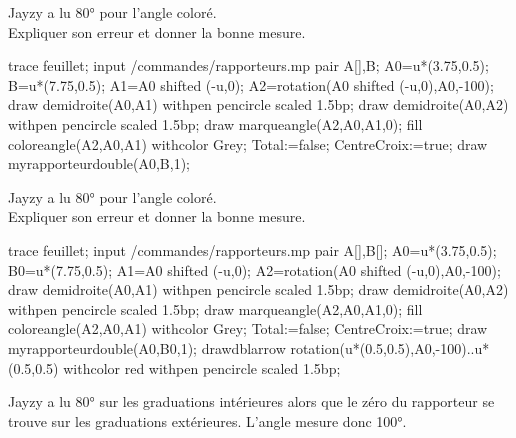 \begin{exercice*}
   Jayzy a lu \ang{80} pour l'angle coloré.\\
   Expliquer son erreur et donner la bonne mesure.

   \begin{Geometrie}[CoinHD={(7.5u,4.5u)}]
      trace feuillet;
      input \persopath/commandes/rapporteurs.mp
      pair A[],B;
      A0=u*(3.75,0.5);
      B=u*(7.75,0.5);
      A1=A0 shifted (-u,0); 
      A2=rotation(A0 shifted (-u,0),A0,-100);           
      draw demidroite(A0,A1) withpen pencircle scaled 1.5bp;
      draw demidroite(A0,A2) withpen pencircle scaled 1.5bp;
      draw marqueangle(A2,A0,A1,0);
      fill coloreangle(A2,A0,A1) withcolor Grey;
      Total:=false;%
      CentreCroix:=true;%
      draw myrapporteurdouble(A0,B,1);        
   \end{Geometrie}
   
   \dotfill
   
   \bigskip\dotfill
   
   \bigskip\dotfill
\end{exercice*}
\begin{corrige}
   Jayzy a lu \ang{80} pour l'angle coloré.\\
   Expliquer son erreur et donner la bonne mesure.\\

   \begin{Geometrie}[CoinHD={(7.5u,4.5u)}]
      trace feuillet;
      input \persopath/commandes/rapporteurs.mp
      pair A[],B[];
      A0=u*(3.75,0.5);
      B0=u*(7.75,0.5);
      A1=A0 shifted (-u,0); 
      A2=rotation(A0 shifted (-u,0),A0,-100);           
      draw demidroite(A0,A1) withpen pencircle scaled 1.5bp;
      draw demidroite(A0,A2) withpen pencircle scaled 1.5bp;
      draw marqueangle(A2,A0,A1,0);
      fill coloreangle(A2,A0,A1) withcolor Grey;
      Total:=false;%
      CentreCroix:=true;%
      draw myrapporteurdouble(A0,B0,1);        
      drawdblarrow rotation(u*(0.5,0.5),A0,-100)..u*(0.5,0.5) withcolor red withpen pencircle scaled 1.5bp;
   \end{Geometrie}

   {\red 
   Jayzy a lu \ang{80} sur les graduations intérieures alors que le zéro du rapporteur se trouve sur les graduations extérieures.
   L'angle mesure donc \ang{100}.
   }
\end{corrige}